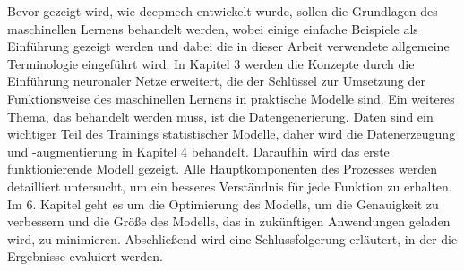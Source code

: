 Bevor gezeigt wird, wie deepmech entwickelt wurde, sollen die Grundlagen des maschinellen Lernens behandelt werden, wobei einige einfache Beispiele als Einführung gezeigt werden und dabei die in dieser Arbeit verwendete allgemeine Terminologie eingeführt wird.
In Kapitel 3 werden die Konzepte durch die Einführung neuronaler Netze erweitert, die der Schlüssel zur Umsetzung der Funktionsweise des maschinellen Lernens in praktische Modelle sind.
Ein weiteres Thema, das behandelt werden muss, ist die Datengenerierung. Daten sind ein wichtiger Teil des Trainings statistischer Modelle, daher wird die Datenerzeugung und -augmentierung in Kapitel 4 behandelt.
Daraufhin wird das erste funktionierende Modell gezeigt.
Alle Hauptkomponenten des Prozesses werden detailliert untersucht, um ein besseres Verständnis für jede Funktion zu erhalten.
Im 6. Kapitel geht es um die Optimierung des Modells, um die Genauigkeit zu verbessern und die Größe des Modells, das in zukünftigen Anwendungen geladen wird, zu minimieren.
Abschließend wird eine Schlussfolgerung erläutert, in der die Ergebnisse evaluiert werden.
